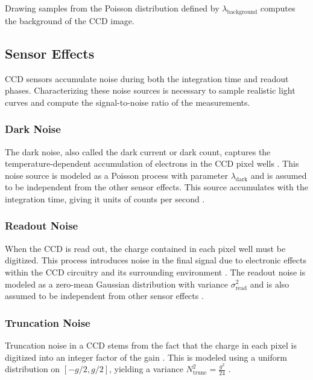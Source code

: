 Drawing samples from the Poisson distribution defined by $\lambda_\mathrm{background}$ computes the background of the CCD image. 

\subsection{Sensor Effects}

CCD sensors accumulate noise during both the integration time and readout phases. Characterizing these noise sources is necessary to sample realistic light curves and compute the signal-to-noise ratio of the measurements.

\subsubsection{Dark Noise}

The dark noise, also called the dark current or dark count, captures the temperature-dependent accumulation of electrons in the CCD pixel wells \cite{krag2003}. This noise source is modeled as a Poisson process with parameter $\lambda_\mathrm{dark}$ \cite{frueh2019notes} and is assumed to be independent from the other sensor effects. This source accumulates with the integration time, giving it units of counts per second \cite{krag2003}.

\subsubsection{Readout Noise}

When the CCD is read out, the charge contained in each pixel well must be digitized. This process introduces noise in the final signal due to electronic effects within the CCD circuitry and its surrounding environment \cite{krag2003}. The readout noise is modeled as a zero-mean Gaussian distribution with variance $\sigma_\mathrm{read}^2$ and is also assumed to be independent from other sensor effects \cite{frueh2019notes}.

\subsubsection{Truncation Noise} \label{sec:trunc_noise}

Truncation noise in a CCD stems from the fact that the charge in each pixel is digitized into an integer factor of the gain \cite{frueh2019notes}. This is modeled using a uniform distribution on $\left[ -g/2, g/2 \right]$, yielding a variance $N^2_\mathrm{trunc} = \frac{g^2}{24}$ \cite{frueh2019notes}.

